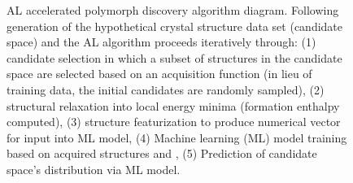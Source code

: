\begin{figure}[!htb]
\centering
{}
\caption{\label{fig:all_diagram}
%
AL accelerated polymorph discovery algorithm diagram.
%
%
Following generation of the hypothetical crystal structure data set (candidate space) and the AL algorithm proceeds iteratively through:
(1) candidate selection in which a subset of structures in the candidate space are selected based on an acquisition function (in lieu of training data, the initial candidates are randomly sampled),
(2) structural relaxation into local energy minima (formation enthalpy computed),
(3) structure featurization to produce numerical vector for input into ML model,
(4) Machine learning (ML) model training based on acquired structures and \DHf,
(5) Prediction of candidate space's \DHf distribution via ML model.
%
}
\end{figure}


